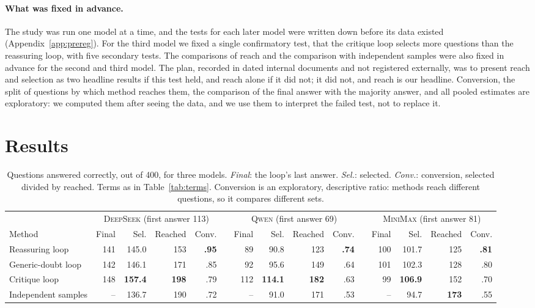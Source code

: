 \documentclass[11pt]{article}
\newcommand{\ds}{\textsc{DeepSeek}}
\newcommand{\qw}{\textsc{Qwen}}
\newcommand{\mm}{\textsc{MiniMax}}
\begin{document}
\paragraph{What was fixed in advance.}
The study was run one model at a time, and the tests for each later model were written down before its data existed (Appendix~\ref{app:prereg}).
For the third model we fixed a single confirmatory test, that the critique loop selects more questions than the reassuring loop, with five secondary tests.
The comparisons of reach and the comparison with independent samples were also fixed in advance for the second and third model.
The plan, recorded in dated internal documents and not registered externally, was to present reach and selection as two headline results if this test held, and reach alone if it did not; it did not, and reach is our headline.
Conversion, the split of questions by which method reaches them, the comparison of the final answer with the majority answer, and all pooled estimates are exploratory: we computed them after seeing the data, and we use them to interpret the failed test, not to replace it.

\section{Results}

\begin{table}[t]
\centering
\small
\setlength{\tabcolsep}{3.4pt}
\begin{tabular}{@{}l rrrr c rrrr c rrrr@{}}
\toprule
 & \multicolumn{4}{c}{\ds{} (first answer 113)} & & \multicolumn{4}{c}{\qw{} (first answer 69)} & & \multicolumn{4}{c}{\mm{} (first answer 81)} \\
\cmidrule(lr){2-5}\cmidrule(lr){7-10}\cmidrule(l){12-15}
Method & Final & Sel. & Reached & Conv. & & Final & Sel. & Reached & Conv. & & Final & Sel. & Reached & Conv. \\
\midrule
Reassuring loop & 141 & 145.0 & 153 & \textbf{.95} & & 89 & 90.8 & 123 & \textbf{.74} & & 100 & 101.7 & 125 & \textbf{.81} \\
Generic-doubt loop & 142 & 146.1 & 171 & .85 & & 92 & 95.6 & 149 & .64 & & 101 & 102.3 & 128 & .80 \\
Critique loop & 148 & \textbf{157.4} & \textbf{198} & .79 & & 112 & \textbf{114.1} & \textbf{182} & .63 & & 99 & \textbf{106.9} & 152 & .70 \\
Independent samples & -- & 136.7 & 190 & .72 & & -- & 91.0 & 171 & .53 & & -- & 94.7 & \textbf{173} & .55 \\
\bottomrule
\end{tabular}
\caption{Questions answered correctly, out of 400, for three models. \emph{Final}: the loop's last answer. \emph{Sel.}: selected. \emph{Conv.}: conversion, selected divided by reached. Terms as in Table~\ref{tab:terms}. Conversion is an exploratory, descriptive ratio: methods reach different questions, so it compares different sets.}
\label{tab:main}
\end{table}
\end{document}
